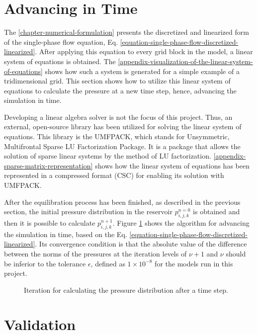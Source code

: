 \section{Advancing in Time}

The \autoref{chapter-numerical-formulation} presents the discretized and linearized form of the single-phase flow equation, Eq. \ref{equation-single-phase-flow-discretized-linearized}.
%
After applying this equation to every grid block in the model, a linear system of equations is obtained.
%
The \autoref{appendix-visualization-of-the-linear-system-of-equations} shows how such a system is generated for a simple example of a tridimensional grid.
%
This section shows how to utilize this linear system of equations to calculate the pressure at a new time step, hence, advancing the simulation in time.

Developing a linear algebra solver is not the focus of this project.
%
Thus, an external, open-source library has been utilized for solving the linear system of equations.
%
This library is the UMFPACK, which stands for Unsymmetric, Multifrontal Sparse LU Factorization Package.
%
It is a package that allows the solution of sparse linear systems by the method of LU factorization.
%
\autoref{appendix-sparse-matrix-representation} shows how the linear system of equations has been represented in a compressed format (CSC) for enabling its solution with UMFPACK.

After the equilibration process has been finished, as described in the previous section, the initial pressure distribution in the reservoir $p_{i,j,k}^{n = 0}$ is obtained and then it is possible to calculate $p_{i,j,k}^{n + 1}$.
%
Figure \ref{figure-advance-in-time-flow-chart} shows the algorithm for advancing the simulation in time, based on the Eq. \ref{equation-single-phase-flow-discretized-linearized}.
%
Its convergence condition is that the absolute value of the difference between the norms of the pressures at the iteration levels of $\nu+1$ and $\nu$ should be inferior to the tolerance $\epsilon$, defined as $1 \times 10^{-8}$ for the models run in this project.
%
%
\begin{figure}[H]
	\centering
	\scalebox{.9}{}
	\caption{Iteration for calculating the pressure distribution after a time step.}
	\label{figure-advance-in-time-flow-chart}
\end{figure}

\section{Validation}

